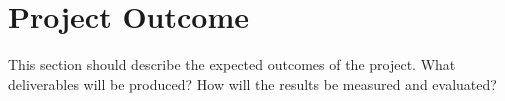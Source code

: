 \section{Project Outcome}
\label{sec:outcome}
This section should describe the expected outcomes of the project. What deliverables will be produced? How will the results be measured and evaluated?
